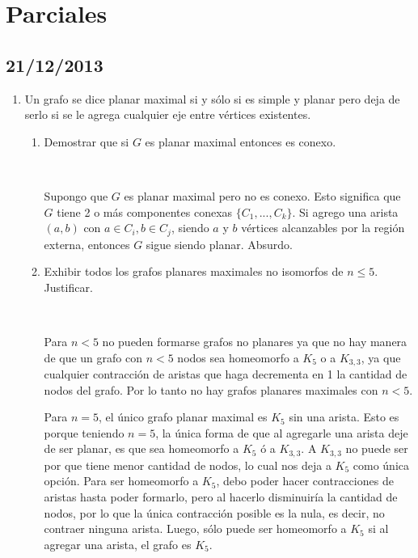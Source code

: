 \section{Parciales}

\subsection*{21/12/2013}

\begin{enumerate}

\item
Un grafo se dice planar maximal si y sólo si es simple y planar pero deja de
serlo si se le agrega cualquier eje entre vértices existentes.

\begin{enumerate}[label=\alph*)]
\item
Demostrar que si $G$ es planar maximal entonces es conexo.

~

Supongo que $G$ es planar maximal pero no es conexo. Esto significa que $G$
tiene 2 o más componentes conexas $\{C_1, ..., C_k\}$. Si agrego una arista
$(a, b)$ con $a \in C_i, b \in C_j$, siendo $a$ y $b$ vértices alcanzables
por la región externa, entonces $G$ sigue siendo planar. Absurdo.

\item
Exhibir todos los grafos planares maximales no isomorfos de $n \leq 5$.
Justificar.

~

Para $n < 5$ no pueden formarse grafos no planares ya que no hay manera de
que un grafo con $n < 5$ nodos sea homeomorfo a $K_5$ o a $K_{3,3}$, ya que
cualquier contracción de aristas que haga decrementa en 1 la cantidad de
nodos del grafo. Por lo tanto no hay grafos planares maximales con $n < 5$.

Para $n = 5$, el único grafo planar maximal es $K_5$ sin una arista. Esto es
porque teniendo $n = 5$, la única forma de que al agregarle una arista deje
de ser planar, es que sea homeomorfo a $K_5$ ó a $K_{3,3}$. A $K_{3,3}$ no
puede ser por que tiene menor cantidad de nodos, lo cual nos deja a $K_5$ como
única opción. Para ser homeomorfo a $K_5$, debo poder hacer contracciones de
aristas hasta poder formarlo, pero al hacerlo disminuiría la cantidad de
nodos, por lo que la única contracción posible es la nula, es decir, no
contraer ninguna arista. Luego, sólo puede ser homeomorfo a $K_5$ si al
agregar una arista, el grafo es $K_5$.
\end{enumerate}


\end{enumerate}
